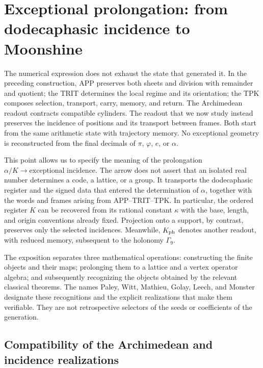 \section{Exceptional prolongation: from dodecaphasic incidence to Moonshine}
\label{exc:seccion}

The numerical expression does not exhaust the state that generated it. In the
preceding construction, APP preserves both sheets and division with
remainder and quotient; the TRIT determines the local regime and its orientation;
the TPK composes selection, transport, carry, memory, and return. The
Archimedean readout contracts compatible cylinders. The readout that we now
study instead preserves the incidence of positions and its
transport between frames. Both start from the same arithmetic state with
trajectory memory. No exceptional geometry is
reconstructed from the final decimals
of $\pi$, $\varphi$, $e$, or $\alpha$.

This point allows us to specify the meaning of the prolongation
$\alpha/K\longrightarrow\text{exceptional incidence}$. The arrow does not
assert that an isolated real number determines a code, a lattice, or a
group. It transports the dodecaphasic register and the signed data that
entered the determination of $\alpha$, together with the words and
frames arising from APP--TRIT--TPK. In particular, the ordered register
$K$ can be recovered from its rational constant $\kappa$ with the
base, length, and origin conventions already fixed. Projection onto a
support, by contrast, preserves only the selected incidences.
Meanwhile, $K_{\rm ph}$
denotes another readout, with reduced memory, subsequent to the holonomy
$\Gamma_9$.

The exposition separates three mathematical operations: constructing the
finite objects and their maps; prolonging them to a lattice and a vertex
operator algebra; and subsequently recognizing the objects obtained by the
relevant classical theorems. The names Paley, Witt, Mathieu, Golay, Leech, and
Monster designate these recognitions and the explicit realizations
that make them verifiable. They are not retrospective selectors of the
seeds or coefficients of the generation.





\subsection{Compatibility of the Archimedean and incidence realizations}
\label{exc:doble-lectura}

